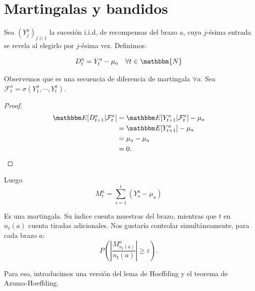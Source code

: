 \section{Martingalas y bandidos}

Sea \((Y^a_j)_{j\geq1}\) la sucesión i.i.d. de recompensas del brazo \(a\), cuya \(j\)-ésima entrada se revela al elegirlo por \(j\)-ésima vez. Definimos:

\begin{equation} \label{eq:dif_martingala_bandits}
    D^a_t = Y^a_t - \mu_a \quad \forall t\in \mathbbm{N}
\end{equation}

Observemos que es una secuencia de diferencia de martingala \(\forall a\). Sea \(\mathcal{F}^a_t = \sigma(Y^a_1, \cdots, Y^a_t )\).

\begin{proof}
    \begin{align*}
        \E{D^a_{t+1} | \mathcal{F}^a_t} &= \E{Y^a_{t+1} | \mathcal{F}^a_t} - \mu_a \\
                                     &= \E{Y^a_{t+1}} - \mu_a \\
                                    &= \mu_a - \mu_a \\
                                    &= 0 \qedhere.
    \end{align*}
\end{proof}

Luego
\begin{equation} \label{eq:martingala_bandits}
    M^a_t = \sum^t_{s=1}(Y^a_s-\mu_a)
\end{equation}

Es una martingala. Su índice cuenta muestras del brazo, mientras que \(t\) en \(n_t(a)\) cuenta tiradas adicionales. Nos gustaría controlar simultáneamente, para cada brazo \(a\):
\[P\left(\left|\frac{M^a_{n_t(a)}}{n_t(a)}\right| \geq \varepsilon\right).\]


Para eso, introducimos una versión del lema de Hoeffding y el teorema de Azuma-Hoeffding.
